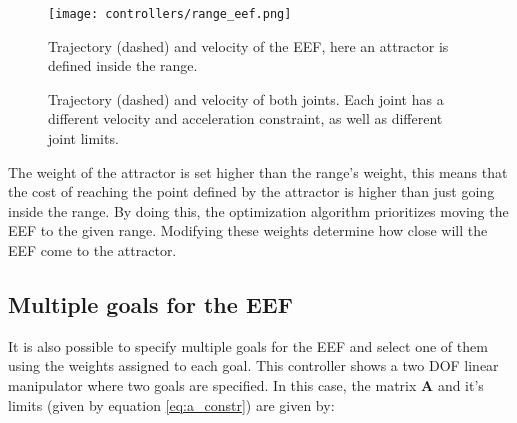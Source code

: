 \begin{figure}[H]
	\centering
	\texttt{[image: controllers/range\_eef.png]}
	\vspace{-10pt}
	\caption[Position range with attractor: EEF]{Trajectory (dashed) and velocity of the EEF, here an attractor is defined inside the range.}
	\vspace{-15pt}
	\label{fig:range_eef}
\end{figure}
\begin{figure}[H]
	\centering
	\begin{subfigure}[][Joint $q_{0}$]
		{\texttt{[image: controllers/range\_q0.png]}}
	\end{subfigure}
	\begin{subfigure}[][Joint $q_{1}$]
		{\texttt{[image: controllers/range\_q1.png]}}
	\end{subfigure}
	\vspace{-12pt}
	\caption[Position range with attractor: Joints]{Trajectory (dashed) and velocity of both joints. Each joint has a different velocity and acceleration constraint, as well as different joint limits.}
	\vspace{-10pt}
	\label{fig:range_q1}
\end{figure}
The weight of the attractor is set higher than the range's weight, this means that the cost of reaching the point defined by the attractor is higher than just going inside the range. By doing this, the optimization algorithm prioritizes moving the EEF to the given range. Modifying these weights determine how close will the EEF come to the attractor.

\subsection{Multiple goals for the EEF}

It is also possible to specify multiple goals for the EEF and select one of them using the weights assigned to each goal. This controller shows a two DOF  linear manipulator where two goals are specified. In this case, the matrix \textbf{A} and it's limits (given by equation \ref{eq:a_constr}) are given by:

